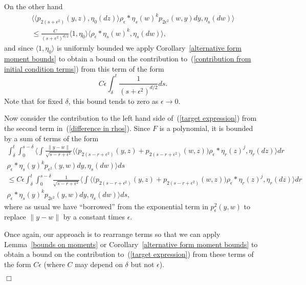 \documentclass[12pt]{article}
\newenvironment {proof}{{\noindent\bf Proof }}{\hfill $\Box$ \medskip}
\numberwithin{equation}{section}
\begin{document}
\begin{proof}
On the other hand
\begin{multline*}
\big\langle\langle p_{2(s+\epsilon^2)}(y,z), \eta_0(dz)\rangle
\rho_\epsilon*\eta_s(w)^kp_{2\epsilon^2}(w,y)dy, \eta_s(dw)\big\rangle
\\
\leq \frac{C}{(s+\epsilon^2)^{d/2}}\langle 1,\eta_0\rangle\big\langle
\rho_\epsilon*\eta_s(w)^k,\eta_s(dw)\big\rangle,
\end{multline*}
and since $\langle 1,\eta_0\rangle$ is uniformly bounded we apply 
Corollary~\ref{alternative form moment bounds} to obtain a bound on
the contribution to~(\ref{contribution from initial condition terms})
from this term of the form
\[C\epsilon\int_\delta^t\frac{1}{(s+\epsilon^2)^{d/2}}ds.\]
Note that for fixed $\delta$, this bound tends to zero as $\epsilon\to 0$.

Now consider the contribution to the left hand side of~(\ref{target expression})
from the second term in~(\ref{difference in rhos}). Since $F$ is a polynomial,
it is bounded by a sum of terms of the form
\begin{multline*}
\int_\delta^t\int_0^{s-\delta}\Big\langle\int\frac{\|y-w\|}{\sqrt{s-r+\epsilon^2}}
\big\langle\big(p_{2(s-r+\epsilon^2)}(y,z)+ p_{2(s-r+\epsilon^2)}(w,z)\big)
\rho_\epsilon*\eta_r(z)^j,\eta_r(dz)\big\rangle dr
\\
\rho_\epsilon*\eta_s(y)^kp_{\epsilon^2}(y,w)dy,\eta_s(dw)
\Big\rangle ds
\\
\leq C\epsilon
\int_\delta^t\int_0^{s-\delta}
	\frac{1}{\sqrt{s-r+\epsilon^2}}
	\Big\langle\int
\big\langle
\big(p_{2(s-r+\epsilon^2)}(y,z)+ p_{2(s-r+\epsilon^2)}(w,z)\big)
\rho_\epsilon*\eta_r(z)^j,\eta_r(dz)\big\rangle dr
\\
\rho_\epsilon*\eta_s(y)^kp_{2\epsilon^2}(y,w)dy,\eta_s(dw)
\Big\rangle ds,
\end{multline*}
where as usual we have ``borrowed'' from the exponential term in
$p_\epsilon^2(y,w)$ to replace $\|y-w\|$ by a constant times $\epsilon$.

Once again, our approach is to rearrange terms so that we can apply
Lemma~\ref{bounds on moments}
or 
Corollary~\ref{alternative form moment bounds} to obtain a bound on
the contribution to~(\ref{target expression})
from these terms of the form $C\epsilon$ (where $C$ may depend on $\delta$
but not $\epsilon$).


\end{proof}
\end{document}
